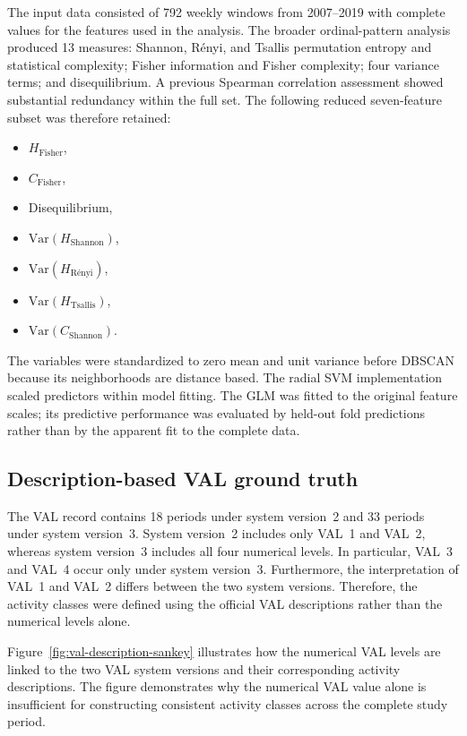 \documentclass[11pt]{article}
\begin{document}
The input data consisted of 792 weekly windows from 2007--2019 with complete values for the features used in the analysis. The broader ordinal-pattern analysis produced 13 measures: Shannon, R\'enyi, and Tsallis permutation entropy and statistical complexity; Fisher information and Fisher complexity; four variance terms; and disequilibrium. A previous Spearman correlation assessment showed substantial redundancy within the full set.
The following reduced seven-feature subset was therefore retained:

\begin{itemize}
	\item $H_{\text{Fisher}}$,
	\item $C_{\text{Fisher}}$,
	\item Disequilibrium,
	\item $\mathrm{Var}(H_{\text{Shannon}})$,
	\item $\mathrm{Var}(H_{\text{R\'enyi}})$,
	\item $\mathrm{Var}(H_{\text{Tsallis}})$,
	\item $\mathrm{Var}(C_{\text{Shannon}})$.
\end{itemize}

The variables were standardized to zero mean and unit variance before DBSCAN because its neighborhoods are distance based. The radial SVM implementation scaled predictors within model fitting. The GLM was fitted to the original feature scales; its predictive performance was evaluated by held-out fold predictions rather than by the apparent fit to the complete data.

\subsection{Description-based VAL ground truth}

The VAL record contains 18 periods under system version~2 and 33 periods under system version~3. System version~2 includes only VAL~1 and VAL~2, whereas system version~3 includes all four numerical levels. In particular, VAL~3 and VAL~4 occur only under system version~3.
Furthermore, the interpretation of VAL~1 and VAL~2 differs between the two system versions. Therefore, the activity classes were defined using the official VAL descriptions rather than the numerical levels alone.

Figure~\ref{fig:val-description-sankey} illustrates how the numerical VAL levels are linked to the two VAL system versions and their corresponding activity descriptions. The figure demonstrates why the numerical VAL value alone is insufficient for constructing consistent
activity classes across the complete study period.
\end{document}
